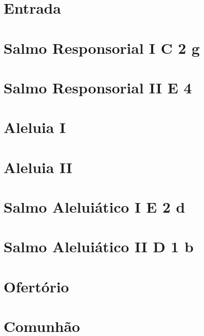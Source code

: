 \documentclass[a4paper]{memoir}
\title{\mytitle}
\author{}
\date{}
\begin{document}
\maketitle

\begin{multicols}{2}
  \section{Entrada}

  \section[Salmo Responsorial I]{Salmo Responsorial I \textmd{C 2 g}}\label{subsection:tempus-per-annum/missa-6/psalmus-responsorius-1}

  \section[Salmo Responsorial II]{Salmo Responsorial II \textmd{E 4}}\label{subsection:tempus-per-annum/missa-6/psalmus-responsorius-2}

  \section{Aleluia I}\label{subsection:tempus-per-annum/missa-6/alleluia-1}

  \section{Aleluia II}\label{subsection:tempus-per-annum/missa-6/alleluia-2}

  \section[Salmo Aleluiático I]{Salmo Aleluiático I \textmd{E 2 d}}\label{subsection:tempus-per-annum/missa-6/psalmus-alleluiaticus-1}

  \section[Salmo Aleluiático II]{Salmo Aleluiático II \textmd{D 1 b}}\label{subsection:tempus-per-annum/missa-6/psalmus-alleluiaticus-2}

  \section{Ofertório}

  \section{Comunhão}
\end{multicols}
\end{document}
